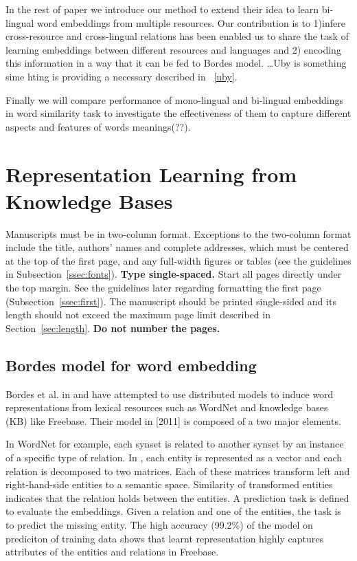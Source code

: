 \documentclass[11pt]{article}
\begin{document}
 In the rest of paper we introduce our method to extend their idea to learn
 bi-lingual word embeddings from multiple resources. Our contribution is to
 1)infere cross-resource and cross-lingual relations has been enabled us to
 share the task of learning embeddings between different resources and languages and 2) encoding this
 information in a way that it can be fed to Bordes model. \ldots Uby is
 something sime hting  is providing a necessary described in ~\ref{uby}.
 
 Finally we will compare performance of mono-lingual and bi-lingual
 embeddings in word similarity task to investigate the effectiveness of them to
 capture different aspects and features of words meanings(??).
 
 

\section{Representation Learning from Knowledge Bases}

Manuscripts must be in two-column format.  Exceptions to the
two-column format include the title, authors' names and complete
addresses, which must be centered at the top of the first page, and
any full-width figures or tables (see the guidelines in
Subsection~\ref{ssec:fonts}). {\bf Type single-spaced.}  Start all
pages directly under the top margin. See the guidelines later
regarding formatting the first page (Subsection~\ref{ssec:first}).
The manuscript should be printed single-sided and its length should
not exceed the maximum page limit described in
Section~\ref{sec:length}.  {\bf Do not number the pages.}

\subsection{Bordes model for word embedding}

Bordes et al. in \cite{Bordes2011} and \cite{Bordes2012} have attempted to use
distributed models to induce word representations from lexical resources such as
WordNet and knowledge bases (KB) like Freebase. Their model in [2011] is
composed of a two major elements. 

 In WordNet for example, each synset is related to another synset by an instance
 of a specific type of relation. 
In \cite{Bordes2011}, each entity is represented as a vector and each relation is decomposed to two
matrices. Each of these matrices transform left and right-hand-side entities
to a semantic space. Similarity of transformed entities indicates that the
relation holds between the entities.  A prediction task is defined to evaluate
the embeddings. Given a relation and one of the entities, the task is to predict
the missing entity. The high accuracy (99.2\%) of the model on prediciton
of training data shows that learnt representation highly captures attributes of
the entities and relations in Freebase.
\end{document}

